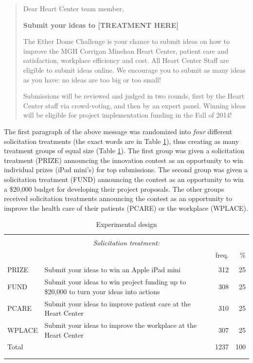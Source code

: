 \documentclass[12pt, titlepage]{article}
\begin{document}
\begin{quote}
Dear Heart Center team member,

\textbf{Submit your ideas to {[}TREATMENT HERE{]}}

The Ether Dome Challenge is your chance to submit ideas on how to
improve the MGH Corrigan Minehan Heart Center, patient care and
satisfaction, workplace efficiency and cost. All Heart Center Staff are
eligible to submit ideas online. We encourage you to submit as many
ideas as you have: no ideas are too big or too small!

Submissions will be reviewed and judged in two rounds, first by the
Heart Center staff via crowd-voting, and then by an expert panel.
Winning ideas will be eligible for project implementation funding in the
Fall of 2014!
\end{quote}

The first paragraph of the above message was randomized into \emph{four}
different solicitation treatments (the exact words are in Table
\ref{experimental-design}), thus creating as many treatment groups of
equal size (Table \ref{experimental-design}). The first group was given
a solicitation treatment (PRIZE) announcing the innovation contest as an
opportunity to win individual prizes (iPad mini's) for top submissions.
The second group was given a solicitation treatment (FUND) announcing
the contest as an opportunity to win a \$20,000 budget for developing
their project proposals. The other groups received solicitation
treatments announcing the contest as an opportunity to improve the
health care of their patients (PCARE) or the workplace (WPLACE).

\begin{table}
\centering
\caption{Experimental design}
\label{experimental-design}
\begin{tabular}{@{}lp{5cm}>{\raggedright}rr}
  \\[-1.8ex]\hline \hline \\[-1.8ex]
 & \multicolumn{1}{c}{\emph{Solicitation treatment:}}
                        & \multicolumn{2}{c}{\emph{Employees:}}\\
                        \cmidrule(lr){2-2}\cmidrule(lr){3-4} &   & freq. & \% \\ 
  \hline \\[-1.86ex]
PRIZE & Submit your ideas to win an Apple iPad mini & 312 & 25 \\ 
  [1.8ex] FUND & Submit your ideas to win project funding up to \$20,000 
            to turn your ideas into actions & 308 & 25 \\ 
  [1.8ex] PCARE & Submit your ideas to improve patient care at the Heart Center & 310 & 25 \\ 
  [1.8ex] WPLACE & Submit your ideas to improve the workplace at the Heart Center & 307 & 25 \\ 
  [1.8ex] Total &  & 1237 & 100 \\ 
   \\[-1.8ex]\hline \hline \\[-1.8ex]
\end{tabular}
\end{table}
\end{document}
